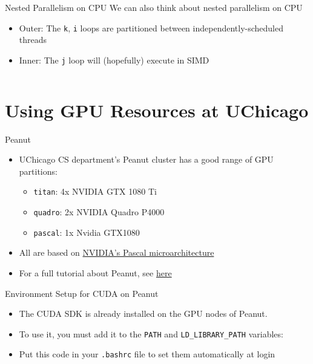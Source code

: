 \documentclass{beamer}
\begin{document}
    \begin{frame}{Nested Parallelism on CPU}
        We can also think about nested parallelism on CPU
        \begin{itemize}
            \item Outer: The \texttt{k}, \texttt{i} loops are partitioned between independently-scheduled threads
            \item Inner: The \texttt{j} loop will (hopefully) execute in SIMD
        \end{itemize}
        \begin{block}{}
            \inputminted{c}{src/dgemm-concept.c}
        \end{block}
    \end{frame}

    \section{Using GPU Resources at UChicago}

    \begin{frame}{Peanut}
        \begin{itemize}
            \item UChicago CS department's Peanut cluster has a good range of GPU partitions:
            \begin{itemize}
                \item \texttt{titan}: 4x NVIDIA GTX 1080 Ti
                \item \texttt{quadro}: 2x NVIDIA Quadro P4000
                \item \texttt{pascal}: 1x Nvidia GTX1080
            \end{itemize}
            \item All are based on \href{https://en.wikipedia.org/wiki/Pascal_(microarchitecture)}{NVIDIA's Pascal microarchitecture}
            \item For a full tutorial about Peanut, see \href{https://paper.dropbox.com/doc/MPCS-51087-Peanut-Guide--BEH4QScOO4aUHCdYBIXHJTuOAQ-H2Qv2MChSshxwVqF7cuFH}{here}
        \end{itemize}
    \end{frame}

    \begin{frame}{Environment Setup for CUDA on Peanut}
        \begin{itemize}
            \item The CUDA SDK is already installed on the GPU nodes of Peanut.
            \item To use it, you must add it to the \texttt{PATH} and \texttt{LD\_LIBRARY\_PATH} variables:
            \item Put this code in your \texttt{.bashrc} file to set them automatically at login
            \begin{block}{}
                \inputminted{bash}{src/cuda_rc.sh}
            \end{block}
        \end{itemize}
    \end{frame}
\end{document}
